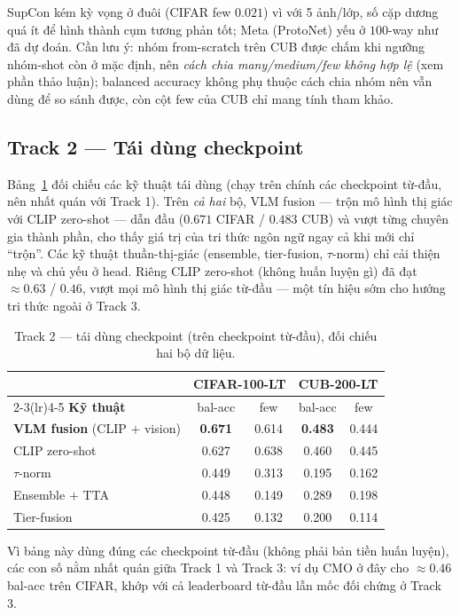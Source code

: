 SupCon kém kỳ vọng ở đuôi (CIFAR few $0.021$) vì với 5 ảnh/lớp, số cặp dương quá ít để hình thành
cụm tương phản tốt; Meta (ProtoNet) yếu ở $100$-way như đã dự đoán. Cần lưu ý: nhóm from-scratch
trên CUB được chấm khi ngưỡng nhóm-shot còn ở mặc định, nên \emph{cách chia many/medium/few không
hợp lệ} (xem phần thảo luận); balanced accuracy không phụ thuộc cách chia nhóm nên vẫn dùng để so
sánh được, còn cột few của CUB chỉ mang tính tham khảo.

\subsection{Track 2 --- Tái dùng checkpoint}

Bảng~\ref{tab:reuse} đối chiếu các kỹ thuật tái dùng (chạy trên chính các checkpoint từ-đầu, nên
nhất quán với Track 1). Trên \emph{cả hai} bộ, VLM fusion --- trộn mô hình thị giác với CLIP
zero-shot --- dẫn đầu ($0.671$ CIFAR / $0.483$ CUB) và vượt từng chuyên gia thành phần, cho thấy giá
trị của tri thức ngôn ngữ ngay cả khi mới chỉ ``trộn''. Các kỹ thuật thuần-thị-giác (ensemble,
tier-fusion, $\tau$-norm) chỉ cải thiện nhẹ và chủ yếu ở head. Riêng CLIP zero-shot (không huấn
luyện gì) đã đạt $\approx 0.63$ / $0.46$, vượt mọi mô hình thị giác từ-đầu --- một tín hiệu sớm cho
hướng tri thức ngoài ở Track 3.

\begin{table}[H]
\centering
\caption{Track 2 --- tái dùng checkpoint (trên checkpoint từ-đầu), đối chiếu hai bộ dữ liệu.}
\label{tab:reuse}
\begin{tabular}{lcccc}
\toprule
 & \multicolumn{2}{c}{\textbf{CIFAR-100-LT}} & \multicolumn{2}{c}{\textbf{CUB-200-LT}} \\
\cmidrule(lr){2-3}\cmidrule(lr){4-5}
\textbf{Kỹ thuật} & bal-acc & few & bal-acc & few \\
\midrule
\textbf{VLM fusion} (CLIP $+$ vision) & \textbf{0.671} & 0.614 & \textbf{0.483} & 0.444 \\
CLIP zero-shot & 0.627 & 0.638 & 0.460 & 0.445 \\
$\tau$-norm & 0.449 & 0.313 & 0.195 & 0.162 \\
Ensemble $+$ TTA & 0.448 & 0.149 & 0.289 & 0.198 \\
Tier-fusion & 0.425 & 0.132 & 0.200 & 0.114 \\
\bottomrule
\end{tabular}
\end{table}

Vì bảng này dùng đúng các checkpoint từ-đầu (không phải bản tiền huấn luyện), các con số nằm nhất
quán giữa Track 1 và Track 3: ví dụ CMO ở đây cho $\approx 0.46$ bal-acc trên CIFAR, khớp với cả
leaderboard từ-đầu lẫn mốc đối chứng ở Track 3.

